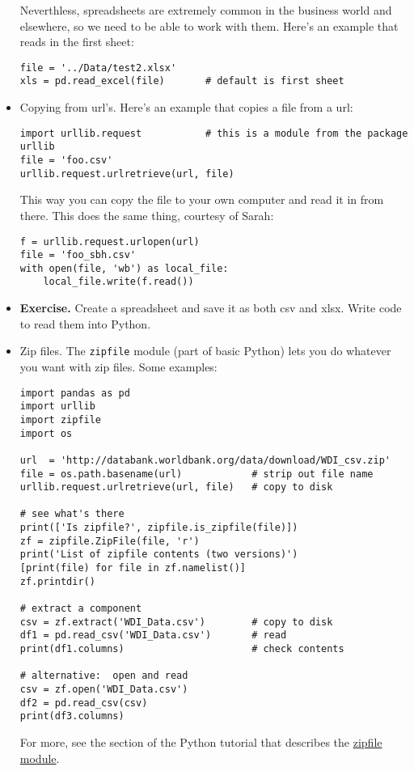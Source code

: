 \documentclass[11pt]{article}
\begin{document}
\begin{itemize}
Neverthless, spreadsheets are extremely common in the business world and elsewhere,
so we need to be able to work with them.
Here's an example that reads in the first sheet:
\begin{verbatim}
file = '../Data/test2.xlsx'
xls = pd.read_excel(file)       # default is first sheet
\end{verbatim}


\item Copying from url's.
Here's an example that copies a file from a url:
\begin{verbatim}
import urllib.request           # this is a module from the package urllib
file = 'foo.csv'
urllib.request.urlretrieve(url, file)
\end{verbatim}
This way you can copy the file to your own computer and read it in from there.
This does the same thing, courtesy of Sarah:
\begin{verbatim}
f = urllib.request.urlopen(url)
file = 'foo_sbh.csv'
with open(file, 'wb') as local_file:
    local_file.write(f.read())
\end{verbatim}

\item {\bf Exercise.}  Create a spreadsheet and save it as both csv and xlsx.
Write code to read them into Python.


\item Zip files.  The {\tt zipfile} module (part of basic Python)
lets you do whatever you want with zip files.
Some examples:
\begin{verbatim}
import pandas as pd
import urllib
import zipfile
import os

url  = 'http://databank.worldbank.org/data/download/WDI_csv.zip'
file = os.path.basename(url)            # strip out file name
urllib.request.urlretrieve(url, file)   # copy to disk

# see what's there
print(['Is zipfile?', zipfile.is_zipfile(file)])
zf = zipfile.ZipFile(file, 'r')
print('List of zipfile contents (two versions)')
[print(file) for file in zf.namelist()]
zf.printdir()

# extract a component
csv = zf.extract('WDI_Data.csv')        # copy to disk
df1 = pd.read_csv('WDI_Data.csv')       # read
print(df1.columns)                      # check contents

# alternative:  open and read
csv = zf.open('WDI_Data.csv')
df2 = pd.read_csv(csv)
print(df3.columns)
\end{verbatim}
For more, see the section of the Python tutorial that describes the
\href{https://docs.python.org/3.4/library/zipfile.html#module-zipfile}{zipfile module}.

\end{itemize}
\end{document}
